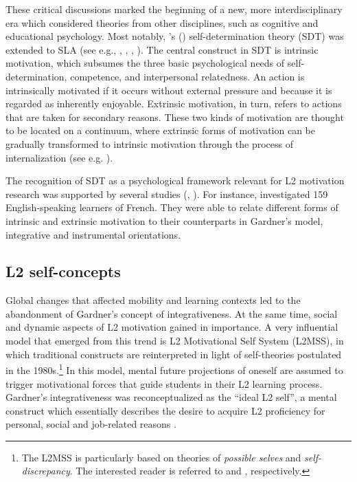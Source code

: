 \documentclass[output=paper]{langscibook}
\begin{document}
These critical discussions marked the beginning of a new, more interdisciplinary era which considered theories from other disciplines, such as cognitive and educational psychology. Most notably, \citeauthor{DeciRyan1985}'s (\citeyear{DeciRyan1985,DeciRyan2002}) self-de\-ter\-mi\-na\-tion theory (SDT) was extended to SLA (see e.g., \citealt{Doernyei1994}, \citealt{Dickinson1995}, \citealt{SchmidtEtAl1996}, \citealt{NoelsEtAl1999,NoelsEtAl2000}). The central construct in SDT is intrinsic motivation, which subsumes the three basic psychological needs of self-determination, competence, and interpersonal relatedness. An action is intrinsically motivated if it occurs without external pressure and because it is regarded as inherently enjoyable. Extrinsic motivation, in turn, refers to actions that are taken for secondary reasons. These two kinds of motivation are thought to be located on a continuum, where extrinsic forms of motivation can be gradually transformed to intrinsic motivation through the process of internalization (see e.g. \citealt{DeciRyan1985}). 

The recognition of SDT as a psychological framework relevant for L2 motivation research was supported by several studies (\citealt{NoelsEtAl2000}, \citealt{Noels2001}). For instance, \citet[72--74]{NoelsEtAl2000} investigated 159 English-speaking learners of French. They were able to relate different forms of intrinsic and extrinsic motivation to their counterparts in Gardner’s model, integrative and instrumental orientations.

\subsection{L2 self-concepts} %

Global changes that affected mobility and learning contexts led to the abandonment of Gardner’s concept of integrativeness. At the same time, social and dynamic aspects of L2 motivation gained in importance. A very influential model that emerged from this trend is  L2 Motivational Self System (L2MSS), in which traditional constructs are reinterpreted in light of self-theories postulated in the 1980s.\footnote{The L2MSS is particularly based on theories of \textit{possible selves} and \textit{self-discrepancy}. The interested reader is referred to \citet{MarkusNurius1986} and \citet{Higgins1987}, respectively.} In this model, mental future projections of oneself are assumed to trigger motivational forces that guide students in their L2 learning process. Gardner’s integrativeness was reconceptualized as the “ideal L2 self”, a mental construct which essentially describes the desire to acquire L2 proficiency for personal, social and job-related reasons \citep{Doernyei2009}.
\end{document}
